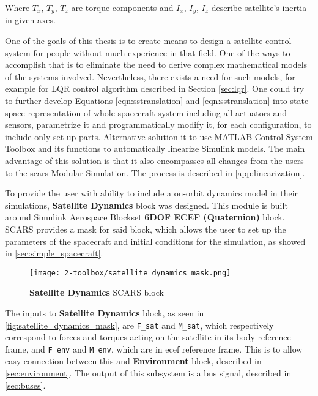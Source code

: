     Where $T_x$, $T_y$, $T_z$ are torque components and $I_x$, $I_y$, $I_z$ describe satellite's inertia in given axes.

    One of the goals of this thesis is to create means to design a satellite control system for people without much experience in that field. One of the ways to accomplish that is to eliminate the need to derive complex mathematical models of the systems involved. Nevertheless, there exists a need for such models, for example for LQR control algorithm described in Section \ref{sec:lqr}. One could try to further develop Equations \ref{eqn:sstranslation} and \ref{eqn:sstranslation} into state-space representation of whole spacecraft system including all actuators and sensors, parametrize it and programmatically modify it, for each configuration, to include only set-up parts. Alternative solution it to use MATLAB Control System Toolbox and its functions to automatically linearize Simulink models. The main advantage of this solution is that it also encompasses all changes from the users to the \ac{scars} Modular Simulation. The process is described in \autoref{app:linearization}.

    
    To provide the user with ability to include a on-orbit dynamics model in their simulations, \textbf{Satellite Dynamics} block was designed. This module is built around Simulink Aerospace Blockset \textbf{6DOF ECEF (Quaternion)} block. SCARS provides a mask for said block, which allows the user to set up the parameters of the spacecraft and initial conditions for the simulation, as showed in \autoref{sec:simple_spacecraft}.

    \begin{figure}[H]
        \centering
        \texttt{[image: 2-toolbox/satellite\_dynamics\_mask.png]}
        \caption{\textbf{Satellite Dynamics} SCARS block}
        \label{fig:satellite_dynamics_mask}
    \end{figure}

    The inputs to \textbf{Satellite Dynamics} block, as seen in \autoref{fig:satellite_dynamics_mask}, are \verb|F_sat| and \verb|M_sat|, which respectively correspond to forces and torques acting on the satellite in its body reference frame, and \verb|F_env| and \verb|M_env|, which are in \ac{ecef} reference frame. This is to allow easy connection between this and \textbf{Environment} block, described in \autoref{sec:environment}. The output of this subsystem is a bus signal, described in \autoref{sec:buses}.

